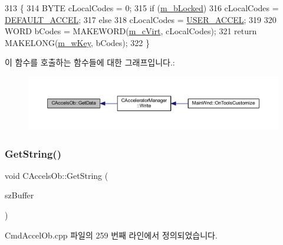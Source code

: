 \begin{DoxyCode}
313 \{
314   BYTE cLocalCodes = 0;
315   \textcolor{keywordflow}{if} (\mbox{\hyperlink{class_c_accels_ob_ad8300bd20bd429ad61f89700e388dd9a}{m\_bLocked}})
316     cLocalCodes = \mbox{\hyperlink{_cmd_accel_ob_8cpp_a34bbba669e2c198ae9348cdd388335b9}{DEFAULT\_ACCEL}};
317   \textcolor{keywordflow}{else}
318     cLocalCodes = \mbox{\hyperlink{_cmd_accel_ob_8cpp_a9997452be9ddc00acb200a6f3157c796}{USER\_ACCEL}};
319   
320   WORD bCodes = MAKEWORD(\mbox{\hyperlink{class_c_accels_ob_a08b7003ccf92c6afcf31878960d8eee1}{m\_cVirt}}, cLocalCodes);
321   \textcolor{keywordflow}{return} MAKELONG(\mbox{\hyperlink{class_c_accels_ob_a1891250e9a4d00c0862f3a90a965d635}{m\_wKey}}, bCodes);
322 \}
\end{DoxyCode}
이 함수를 호출하는 함수들에 대한 그래프입니다.\+:
\nopagebreak
\begin{figure}[H]
\begin{center}
\leavevmode
\includegraphics[width=350pt]{class_c_accels_ob_abbbdc5e93061f67ade785c9e4f07b918_icgraph}
\end{center}
\end{figure}
\mbox{\label{class_c_accels_ob_afaf7510fa1e0707863f6bd469f190de6}} 
\subsubsection{\texorpdfstring{Get\+String()}{GetString()}}
{\footnotesize\ttfamily void C\+Accels\+Ob\+::\+Get\+String (\begin{DoxyParamCaption}\item[{C\+String \&}]{sz\+Buffer }\end{DoxyParamCaption})}



Cmd\+Accel\+Ob.\+cpp 파일의 259 번째 라인에서 정의되었습니다.


